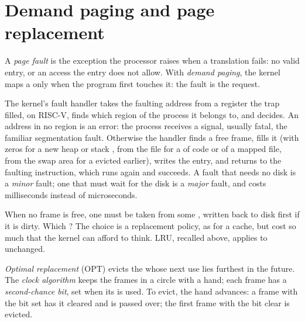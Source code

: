 \section{Demand paging and page replacement}\label{sec:b3:virtual-memory:replacement}

\begin{definition}\label{def:b3:virtual-memory:fault}
A \emph{page fault} is the exception the processor raises when a translation fails: no valid entry, or an access the entry does not allow. With \emph{demand paging}, the kernel maps a  only when the program first touches it: the fault is the request.
\end{definition}

The kernel's fault handler takes the faulting address from a register the trap filled,  on RISC-V, %
finds which region of the process it belongs to, and decides. An address in no region is an error: the process receives a signal, usually fatal, the familiar segmentation fault. Otherwise the handler finds a free frame, fills it (with zeros for a new heap or stack , from the file for a  of code or of a mapped file, from the swap area for a  evicted earlier), writes the entry, and returns to the faulting instruction, which runs again and succeeds. A fault that needs no disk is a \emph{minor} fault; one that must wait for the disk is a \emph{major} fault, and costs milliseconds instead of microseconds.

When no frame is free, one must be taken from some , written back to disk first if it is dirty. Which ? The choice is a replacement policy, as for a cache, but  cost so much that the kernel can afford to think. LRU, recalled above, applies to  unchanged.

\begin{definition}\label{def:b3:virtual-memory:replacement}
\emph{Optimal replacement} (OPT) evicts the  whose next use lies furthest in the future. The \emph{clock algorithm} keeps the frames in a circle with a hand; each frame has a \emph{second-chance bit}, set when its  is used. To evict, the hand advances: a frame with the bit set has it cleared and is passed over; the first frame with the bit clear is evicted.
\end{definition}

